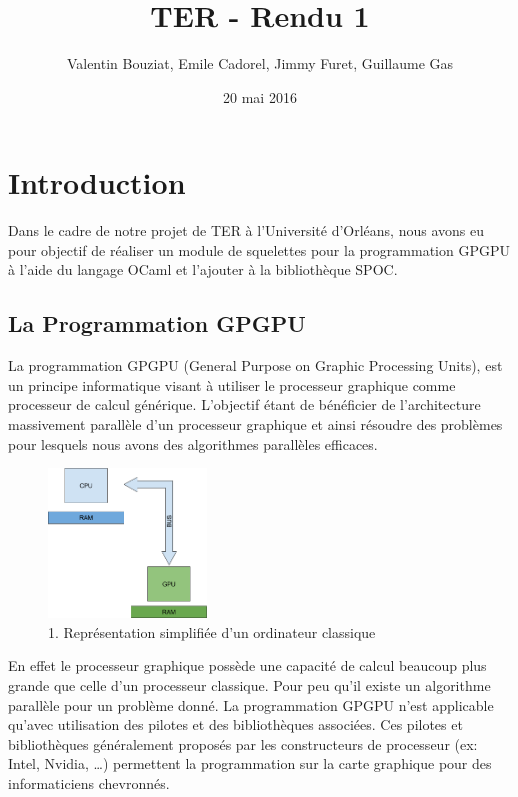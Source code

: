 \documentclass{report}
\title{TER - Rendu 1}
\author{Valentin Bouziat, Emile Cadorel, Jimmy Furet, Guillaume Gas}
\date{20 mai 2016}
\begin{document}
\maketitle

\chapter{Introduction}
Dans le cadre de notre projet de TER à l’Université d’Orléans, nous avons eu pour objectif de réaliser un module de squelettes pour la programmation GPGPU à l’aide du langage OCaml et l’ajouter à la bibliothèque SPOC.

\section{La Programmation GPGPU}
La programmation GPGPU\cite{refProgGPGPU} (General Purpose on Graphic Processing Units), est un principe informatique visant à utiliser le processeur graphique comme processeur de calcul générique. L’objectif étant de bénéficier de l’architecture massivement parallèle d’un processeur graphique et ainsi résoudre des problèmes pour lesquels nous avons des algorithmes parallèles efficaces.\newline

\begin{figure}[!h]
\begin{center}
\includegraphics[height=150]{image1.png}
\end{center}
\caption{1. Représentation simplifiée d'un ordinateur classique}
\label{test}
\end{figure} \newline

En effet le processeur graphique possède une capacité de calcul beaucoup plus grande que celle d’un processeur classique. Pour peu qu’il existe un algorithme parallèle pour un problème donné. La programmation GPGPU n’est applicable qu’avec utilisation des pilotes et des bibliothèques associées. Ces pilotes et bibliothèques généralement proposés par les constructeurs de processeur (ex: Intel, Nvidia, …) permettent la programmation sur la carte graphique pour des informaticiens chevronnés.\newline 
\end{document}

